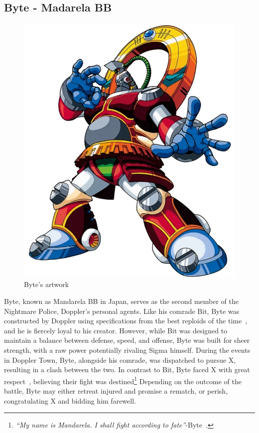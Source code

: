 \subsection{Byte - Madarela BB}\label{boss:Byte}
\begin{figure}[htp]
	\centering
	\includegraphics[height=\portraitsize]{figures/X3/Enemies/byte.png}
	\caption{Byte's artwork~\cite{book:MMX_Complete_art}}
\end{figure}
Byte, known as Mandarela BB in Japan, serves as the second member of the Nightmare Police, Doppler's personal agents. Like his comrade Bit, Byte was constructed by Doppler using specifications from the best reploids of the time~\cite{book:MH_field_guide}, and he is fiercely loyal to his creator. However, while Bit was designed to maintain a balance between defense, speed, and offense, Byte was built for sheer strength, with a raw power potentially rivaling Sigma himself. During the events in Doppler Town, Byte, alongside his comrade, was dispatched to pursue X, resulting in a clash between the two. In contrast to Bit, Byte faced X with great respect~\cite{wiki:Byte}, believing their fight was destined\footnote{\textit{``My name is Mandarela. I shall fight according to fate''}-Byte~\cite{wordpress:X3_japanese_script}.} Depending on the outcome of the battle, Byte may either retreat injured and promise a rematch, or perish, congratulating X and bidding him farewell.
